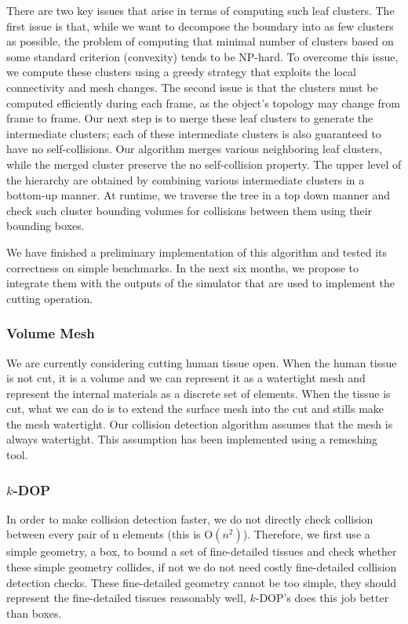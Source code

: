 There are two key issues that arise in terms of computing such leaf clusters. The first issue is that, while we want to decompose the boundary into as few clusters as possible, the problem of computing that minimal number of clusters based on some standard criterion (\eg convexity) tends to be NP-hard. To overcome this issue, we compute these clusters using a greedy strategy that exploits the local connectivity and mesh changes. The second issue is that the clusters must be computed efficiently during each frame, as the object’s topology may change from frame to frame. Our next step is to merge these leaf clusters to generate the intermediate clusters; each of these intermediate clusters is also guaranteed to have no self-collisions. Our algorithm merges various neighboring leaf clusters, while the merged cluster preserve the no self-collision property. The upper level of the hierarchy are obtained by combining various intermediate clusters in a bottom-up manner. At runtime, we traverse the tree in a top down manner and check such cluster bounding volumes for collisions between them using their bounding boxes.

We have finished a preliminary implementation of this algorithm and tested its correctness on simple benchmarks. In the next six months, we propose to integrate them with the outputs of the  simulator that are used to implement the cutting operation.

\subsubsection{Volume Mesh}
\label{sssec:volume_mesh}
We are currently considering cutting human tissue open. When the human tissue is not cut, it is a volume and we can represent it as a watertight mesh and represent the internal materials as a discrete set of elements. When the tissue is cut, what we can do is to extend the surface mesh into the cut and stills make the mesh watertight. Our collision detection algorithm assumes that the mesh is always watertight. This assumption has been implemented using a remeshing tool.

\subsubsection{$k$-DOP}
\label{sssec:kdop}
In order to make collision detection faster, we do not directly check collision between every pair of n elements (this is $\mathrm{O}(n^2)$).  Therefore, we first use a simple geometry, \eg a box, to bound a set of fine-detailed tissues and check whether these simple geometry collides, if not we do not need costly fine-detailed collision detection checks. These fine-detailed geometry cannot be too simple, they should represent the fine-detailed tissues reasonably well, $k$-DOP's does this job better than boxes.

